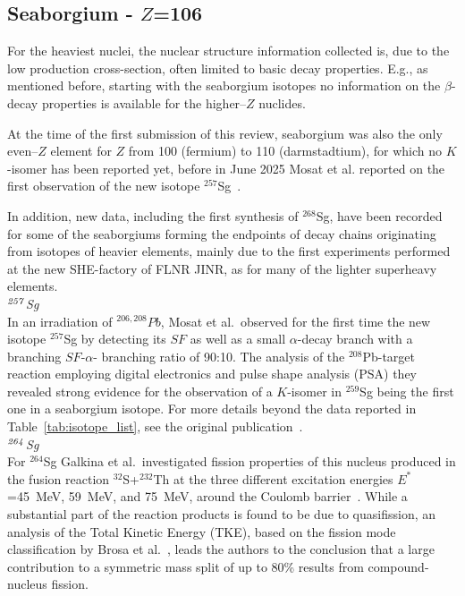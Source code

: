 \subsection{Seaborgium - $Z$=106}\label{Sg}

For the heaviest nuclei, the nuclear structure information collected is, due to the low production cross-section, often limited to basic decay properties. 
E.g., as mentioned before, starting with the seaborgium isotopes no information on the $\beta$-decay properties is available for the higher--$Z$ nuclides.

At the time of the first submission of this review, seaborgium was also the only even--$Z$ element for $Z$ from 100 (fermium) to 110 (darmstadtium), for which no $K$-isomer has been reported yet, before in June 2025 Mosat et al. reported on the first observation of the new isotope $^{257}$Sg~\cite{Mosat2025}. 

In addition, new data, including the first synthesis of $^{268}$Sg, have been recorded for some of the seaborgiums forming the endpoints of decay chains originating from isotopes of heavier elements, mainly due to the first experiments performed at the new SHE-factory of FLNR JINR, as for many of the lighter superheavy elements.\\

{\it $^{\it257}$Sg}\\
In an irradiation of $^{206,208}Pb$, Mosat et al.~observed for the first time the new isotope $^{257}$Sg by detecting its $SF$ as well as a small $\alpha$-decay branch with a branching $SF$-$\alpha$- branching ratio of 90:10. 
The analysis of the $^{208}$Pb-target reaction employing digital electronics and pulse shape analysis (PSA) they revealed strong evidence for the observation of a $K$-isomer in $^{259}$Sg being the first one in a seaborgium isotope.
For more details beyond the data reported in Table~\ref{tab:isotope_list}, see the original publication~\cite{Mosat2025}.\\

{\it $^{\it264}$Sg}\\
For $^{264}$Sg Galkina et al.~investigated fission properties of this nucleus produced in the fusion reaction $^{32}$S+$^{232}$Th at the three different excitation energies $E^*$=45~MeV, 59~MeV, and 75~MeV, around the Coulomb barrier~\cite{Galkina2021}. While a substantial part of the reaction products is found to be due to quasifission, an analysis of the Total Kinetic Energy (TKE), based on the fission mode classification by Brosa et al.~\cite{Brosa1990}, leads the authors to the conclusion that a large contribution to a symmetric mass split of up to 80\% results from compound-nucleus fission.\\

